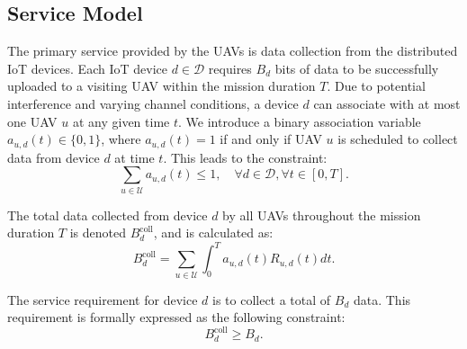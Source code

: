 \documentclass[10pt,conference,letterpaper]{IEEEtran}
\begin{document}





\subsection{Service Model}
\label{subsec:service_model}

The primary service provided by the UAVs is data collection from the distributed IoT devices. Each IoT device $d \in \mathcal{D}$ requires $B_d$ bits of data to be successfully uploaded to a visiting UAV within the mission duration $T$. Due to potential interference and varying channel conditions, a device $d$ can associate with at most one UAV $u$ at any given time $t$. We introduce a binary association variable $a_{u,d}(t) \in \{0, 1\}$, where $a_{u,d}(t)=1$ if and only if UAV $u$ is scheduled to collect data from device $d$ at time $t$. This leads to the constraint:
\begin{equation}
\label{eq:association_constraint}
\sum_{u \in \mathcal{U}} a_{u,d}(t) \leq 1, \quad \forall d \in \mathcal{D}, \forall t \in [0, T].
\end{equation}

The total data collected from device $d$ by all UAVs throughout the mission duration $T$ is denoted $B_{d}^{\text{coll}}$, and is calculated as:
\begin{equation}
\label{eq:collected_data_definition}
B_{d}^{\text{coll}} = \sum_{u \in \mathcal{U}} \int_{0}^{T} a_{u,d}(t) R_{u,d}(t) dt.
\end{equation}

The service requirement for device $d$ is to collect a total of $B_d$ data. This requirement is formally expressed as the following constraint:
\begin{equation}
\label{eq:service_requirement_condition}
B_{d}^{\text{coll}} \geq B_d.
\end{equation}
\end{document}
